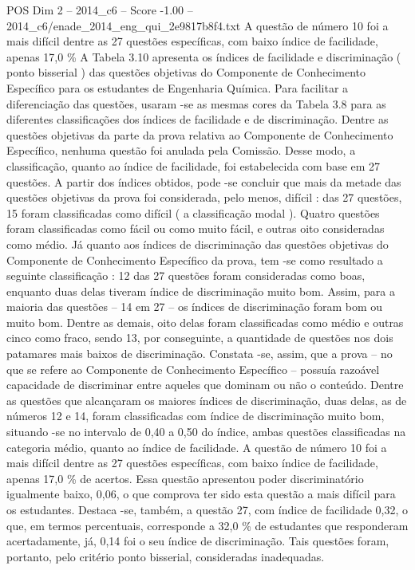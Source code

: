\begin{textsample}{POS Dim 2 – 2014\_c6 – Score -1.00 – 2014\_c6/enade\_2014\_eng\_qui\_2e9817b8f4.txt}
A questão de número 10 foi a mais difícil dentre as 27 questões específicas, com baixo índice de facilidade, apenas 17,0 \% A Tabela 3.10 apresenta os índices de facilidade e discriminação ( ponto bisserial ) das questões objetivas do Componente de Conhecimento Específico para os estudantes de Engenharia Química.
Para facilitar a diferenciação das questões, usaram -se as mesmas cores da Tabela 3.8 para as diferentes classificações dos índices de facilidade e de discriminação.
Dentre as questões objetivas da parte da prova relativa ao Componente de Conhecimento Específico, nenhuma questão foi anulada pela Comissão.
Desse modo, a classificação, quanto ao índice de facilidade, foi estabelecida com base em 27 questões.
A partir dos índices obtidos, pode -se concluir que mais da metade das questões objetivas da prova foi considerada, pelo menos, difícil : das 27 questões, 15 foram classificadas como difícil ( a classificação modal ).
Quatro questões foram classificadas como fácil ou como muito fácil, e outras oito consideradas como médio.
Já quanto aos índices de discriminação das questões objetivas do Componente de Conhecimento Específico da prova, tem -se como resultado a seguinte classificação : 12 das 27 questões foram consideradas como boas, enquanto duas delas tiveram índice de discriminação muito bom.
Assim, para a maioria das questões – 14 em 27 – os índices de discriminação foram bom ou muito bom.
Dentre as demais, oito delas foram classificadas como médio e outras cinco como fraco, sendo 13, por conseguinte, a quantidade de questões nos dois patamares mais baixos de discriminação.
Constata -se, assim, que a prova – no que se refere ao Componente de Conhecimento Específico – possuía razoável capacidade de discriminar entre aqueles que dominam ou não o conteúdo.
Dentre as questões que alcançaram os maiores índices de discriminação, duas delas, as de números 12 e 14, foram classificadas com índice de discriminação muito bom, situando -se no intervalo de 0,40 a 0,50 do índice, ambas questões classificadas na categoria médio, quanto ao índice de facilidade.
A questão de número 10 foi a mais difícil dentre as 27 questões específicas, com baixo índice de facilidade, apenas 17,0 \% de acertos.
Essa questão apresentou poder discriminatório igualmente baixo, 0,06, o que comprova ter sido esta questão a mais difícil para os estudantes.
Destaca -se, também, a questão 27, com índice de facilidade 0,32, o que, em termos percentuais, corresponde a 32,0 \% de estudantes que responderam acertadamente, já, 0,14 foi o seu índice de discriminação.
Tais questões foram, portanto, pelo critério ponto bisserial, consideradas inadequadas.

\end{textsample}
